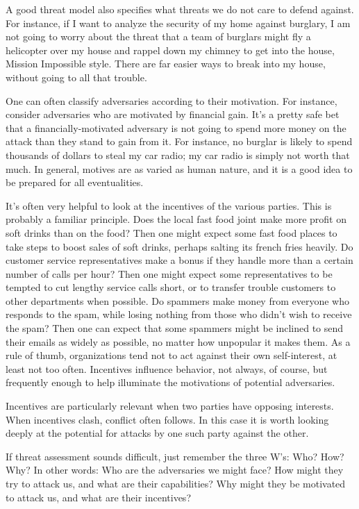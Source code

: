 \documentclass[11pt]{article}
\begin{document}
A good threat model also specifies what threats we do not
care to defend against. For instance, if I want to analyze the
security of my home against burglary, I am not going to worry about
the threat that a team of burglars might fly a helicopter over my house
and rappel down my chimney to get into the house, Mission Impossible
style. There are far easier ways to break into my house, without going
to all that trouble. 

One can often classify adversaries according to
their motivation. For instance, consider adversaries who are motivated
by financial gain. It's a pretty safe bet that a financially-motivated
adversary is not going to spend more money on the attack than they
stand to gain from it. For instance, no burglar is likely to spend
thousands of dollars to steal my car radio; my car radio is simply not
worth that much. In general, motives are as varied as human nature,
and it is a good idea to be prepared for all eventualities. 

It's
often very helpful to look at the incentives of the various
parties. This is probably a familiar principle. Does the local fast
food joint make more profit on soft drinks than on the food? Then one
might expect some fast food places to take steps to boost sales of
soft drinks, perhaps salting its french fries heavily. Do customer
service representatives make a bonus if they handle more than a
certain number of calls per hour? Then one might expect some
representatives to be tempted to cut lengthy service calls short, or
to transfer trouble customers to other departments when possible. Do
spammers make money from everyone who responds to the spam, while
losing nothing from those who didn't wish to receive the spam? Then
one can expect that some spammers might be inclined to send their
emails as widely as possible, no matter how unpopular it makes
them. As a rule of thumb, organizations tend not to act against their
own self-interest, at least not too often. Incentives influence
behavior, not always, of course, but frequently enough to help
illuminate the motivations of potential adversaries. 

Incentives are
particularly relevant when two parties have opposing interests. When
incentives clash, conflict often follows. In this case it is worth
looking deeply at the potential for attacks by one such party against
the other. 

If threat assessment sounds difficult, just remember the
three W's: Who? How? Why? In other words: Who are the adversaries we
might face? How might they try to attack us, and what are their
capabilities? Why might they be motivated to attack us, and what are
their incentives? 
\end{document}
